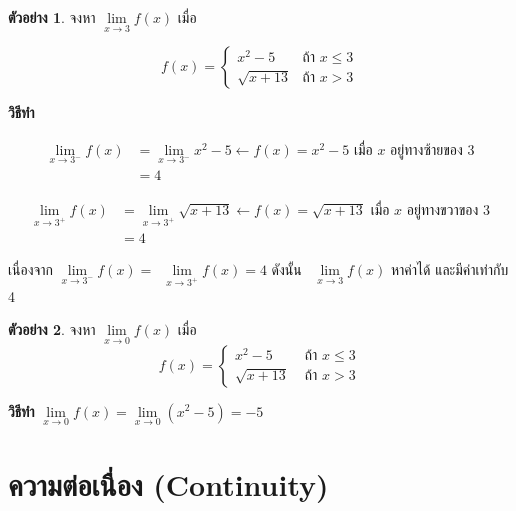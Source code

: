 \documentclass[
]{book}
\theoremstyle{definition}
\theoremstyle{definition}
\newtheorem{example}{ตัวอย่าง}[chapter]
\theoremstyle{definition}
\theoremstyle{definition}
\theoremstyle{remark}
\begin{document}
\begin{example}
\protect\hypertarget{exm:ex-limit-10}{}\label{exm:ex-limit-10}จงหา \(\underset{x\rightarrow 3}{\lim}f\left( x\right)\) เมื่อ

\[
f(x) =
\begin{cases}
x^2 - 5 & \text{ถ้า } x \leq 3 \\
\sqrt{x + 13} & \text{ถ้า } x > 3
\end{cases}
\]
\end{example}

\textbf{วิธีทำ}

\begin{equation}
  \begin{aligned}
    \underset{x\rightarrow 3^{-}}{\lim}f\left( x\right)
    &=\underset{x\rightarrow 3^{-}}{\lim}x^{2}-5 \leftarrow \boxed{  f(x) = x^{2}-5  \mbox{ เมื่อ $x$ อยู่ทางซ้ายของ 3}}\\
    &=4
  \end{aligned}
\end{equation}

\begin{equation}
  \begin{aligned}
    \underset{x\rightarrow 3^{+}}{\lim}f\left( x\right)
        &= \underset{x\rightarrow 3^{+}}{\lim}\sqrt{x+13} \leftarrow
        \boxed{ f(x)=\sqrt{x+13} \mbox{ เมื่อ $x$ อยู่ทางขวาของ 3}} \\
        &=4
  \end{aligned}
\end{equation}

เนื่องจาก
\(\underset{x\rightarrow 3^{-}}{\lim}f\left( x\right) =\)~\(\underset{x\rightarrow 3^{+}}{\lim}f\left( x\right) =4\)
ดังนั้น ~\(\underset{x\rightarrow 3}{\lim}f\left( x\right)\) หาค่าได้
และมีค่าเท่ากับ 4

\begin{example}
\protect\hypertarget{exm:ex-limit-11}{}\label{exm:ex-limit-11}จงหา \(\underset{x\rightarrow 0}{\lim}f\left( x\right)\) เมื่อ
\[f(x) = \begin{cases}
            x^{2}-5 & \text{ ถ้า } x\leq 3 \\
            \sqrt{x+13}  & \text{ ถ้า } x>3
              \end{cases}\]
\end{example}

\textbf{วิธีทำ}
\(\underset{x\rightarrow 0}{\lim}f(x)=\underset{x\rightarrow 0}{\lim}(x^{2}-5)=-5\)

\section{ความต่อเนื่อง (Continuity)}\label{uxe04uxe27uxe32uxe21uxe15uxe2duxe40uxe19uxe2duxe07-continuity}
\end{document}

